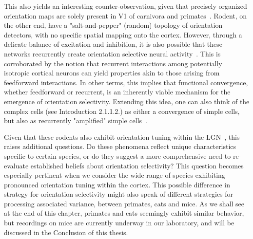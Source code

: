 This also yields an interesting counter-observation, given that precisely organized orientation maps are solely present in \gls{V1} of carnivora and primates~\cite{jang2020retino}. Rodent, on the other end, have a "salt-and-pepper" (random) topology of orientation detectors, with no specific spatial mapping onto the cortex. However, through a delicate balance of excitation and inhibition, it is also possible that these networks recurrently create orientation selective neural activity~\cite{hansel2012mechanism}. This is corroborated by the notion that recurrent interactions among potentially isotropic cortical neurons can yield properties akin to those arising from feedforward interactions. In other terms, this implies that functional convergence, whether feedforward or recurrent, is an inherently viable mechanism for the emergence of orientation selectivity. Extending this idea, one can also think of the complex cells (see Introduction 2.1.1.2.) as either a convergence of simple cells, but also as recurrently "amplified" simple cells~\cite{chance1999complex}.



Given that these rodents also exhibit orientation tuning within the \gls{LGN}~\cite{tan2011orientation}, this raises additional questions. Do these phenomena reflect unique characteristics specific to certain species, or do they suggest a more comprehensive need to re-evaluate established beliefs about orientation selectivity? This question becomes especially pertinent when we consider the wide range of species exhibiting pronounced orientation tuning within the cortex. This possible difference in strategy for orientation selectivity might also speak of different strategies for processing associated variance, between primates, cats and mice. As we shall see at the end of this chapter, primates and cats seemingly exhibit similar behavior, but recordings on mice are currently underway in our laboratory, and will be discussed in the Conclusion of this thesis. 

